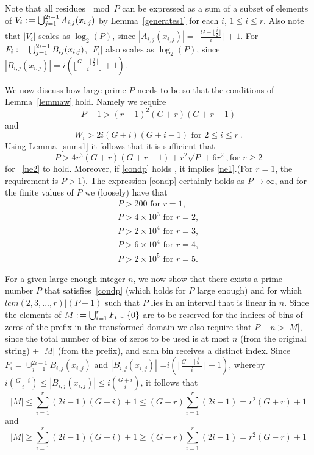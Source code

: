 Note that all residues$~\mod P$ can be expressed as a sum of a
subset of elements of $V_i \asn
\bigcup_{j=1}^{2i-1}A_{i,j}(x_{i,j})$ by Lemma~\ref{generates1} for
each $i$, $1\leq i \leq r$. Also note that $|V_i|$ scales as
$\log_2(P)$, since $|A_{i,j}(x_{i,j})|=\lfloor \frac{G-\lfloor
\frac{j}{2} \rfloor}{i}\rfloor+1$. For $F_i \asn
\bigcup_{j=1}^{2i-1}B_{ij}(x_{i,j})$,
 $|F_i|$ also scales as
$\log_2(P)$, since  $|B_{i,j}(x_{i,j})|=i\left(\lfloor
\frac{G-\lfloor \frac{j}{2} \rfloor}{i}\rfloor+1\right)$.




We now discuss how large prime $P$ needs to be so that the
conditions of Lemma~\ref{lemmaw} hold. Namely we require
\begin{equation}\label{ne1}
P-1> (r-1)^2(G+r)(G+r-1) \end{equation} and
\begin{equation}\label{ne2}W_i>2i(G+i)(G+i-1) \text{ for }2 \leq i \leq r~. \end{equation} Using
Lemma~\ref{sums1} it follows that it is sufficient that
\begin{equation}\label{condp}
P > 4r^3(G+r)(G+r-1)+r^2\sqrt{P}+6r^2~, \text{for } r \geq 2
\end{equation}
for  ~\eqref{ne2} to hold.  Moreover, if \eqref{condp} holds , it
implies \eqref{ne1}.(For $r=1$, the requirement is $P>1$). The
expression \eqref{condp} certainly holds as $P\rightarrow \infty$,
and for the finite values of $P$ we (loosely) have that
\begin{eqnarray*}
P>200 \text{ for } r=1, \\P>4\times 10^3 \text{ for } r=2,
\\P>2\times 10^4 \text{ for } r=3,\\ P>6\times 10^4 \text{ for }
r=4,\\P>2 \times 10^5 \text{ for } r=5.
\end{eqnarray*}

 For a given large enough integer $n$, we now show that
there exists a prime number $P$ that satisfies~\eqref{condp} (which
holds for $P$ large enough) and for which $lcm(2,3,...,r) | (P-1)$
such that $P$ lies in an interval that is linear in $n$. Since the
elements of $M \asn \bigcup_{i=1}^r F_i \cup \{0\}$ are to be
reserved for the indices of bins of zeros of the prefix in the
transformed domain we also require that $P-n > |M|$, since the total
number of bins of zeros to be used is at most $n$ (from the original
string) + $|M|$ (from the prefix), and each bin receives a distinct
index. Since $F_i= \cup_{j=1}^{2i-1} B_{i,j}(x_{i,j})$ and
$|B_{i,j}(x_{i,j})|$ =$i\left( \lfloor \frac{G-\lfloor
\frac{j}{2}\rfloor}{i}\rfloor+1\right)$, whereby $i\left(\frac
{G-i}{i}\right) \leq |B_{i,j}(x_{i,j})|\leq i
\left(\frac{G+i}{i}\right)$, it follows that
\begin{equation}\label{eqM} |M| \leq \sum_{i=1}^r (2i-1)(G+i) +1
\leq (G+r) \sum_{i=1}^r (2i-1) =r^2(G+r)+1\end{equation} and
\begin{equation}\label{eqM2} |M| \geq \sum_{i=1}^r (2i-1)(G-i) +1
\geq  (G-r) \sum_{i=1}^r (2i-1) =r^2(G-r)+1\end{equation}



